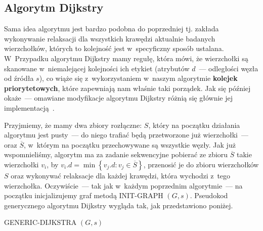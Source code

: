 \subsection{Algorytm Dijkstry}
\label{sub:dijkstraAlgorithm}

Sama idea algorytmu jest bardzo podobna do poprzedniej tj. zakłada wykonywanie relaksacji dla wszystkich krawędzi aktualnie badanych wierzchołków, których to kolejność jest w~specyficzny sposób ustalana. W~Przypadku algorytmu Dijkstry mamy regułę, która mówi, że wierzchołki są skanowane w~niemalejącej kolejności ich etykiet (atrybutów $d$~--- odległości węzła od źródła $s$), co wiąże się z~wykorzystaniem w~naszym algorytmie \textbf{kolejek priorytetowych}, które zapewniają nam właśnie taki porządek. Jak się później okaże~--- omawiane modyfikacje algorytmu Dijkstry różnią się głównie jej implementacją~\cite[$4.5$]{Ahuja:1993:NFT:137406}.

Przyjmiemy, że mamy dwa zbiory rozłączne: $S$, który na początku działania algorytmu jest pusty~--- do niego trafiać będą przetworzone już wierzchołki~--- oraz $\overline{S}$, w~którym na początku przechowywane są wszystkie węzły. Jak już wspomnieliśmy, algorytm ma za zadanie sekwencyjne pobierać ze zbioru $\overline{S}$ takie wierzchołki $v_{i}$, by $v_{i}.d = \min \left\{ v_{j}.d : v_{j} \in \overline{S} \right\}$, przenosić je do zbioru wierzchołków $S$ oraz wykonywać relaksacje dla każdej krawędzi, która wychodzi z~tego wierzchołka. Oczywiście~--- tak jak w~każdym poprzednim algorytmie~--- na początku inicjalizujemy graf metodą \textsc{INIT-GRAPH} $\left( G, s \right)$. Pseudokod generycznego algorytmu Dijkstry wygląda tak, jak przedstawiono poniżej.

\begin{algorithm}[!htbp]
\DontPrintSemicolon
{}
\caption{ GENERIC-DIJKSTRA $\left( G, s \right)$\label{alg:GenericDijksta}}
\end{algorithm}

